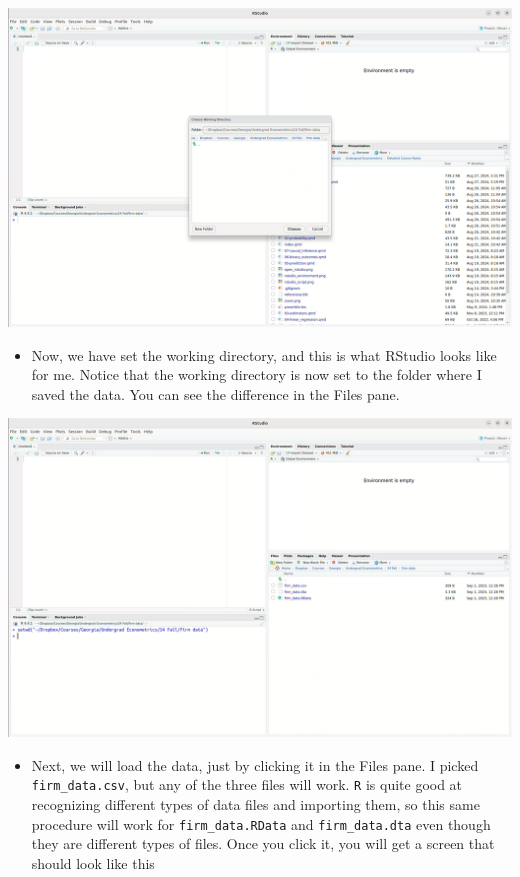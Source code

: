 \documentclass[
  letterpaper,
  DIV=11,
  numbers=noendperiod]{scrreprt}
\providecommand{\tightlist}{%
  \setlength{\itemsep}{0pt}\setlength{\parskip}{0pt}}\usepackage{longtable,booktabs,array}
\begin{document}
\includegraphics{set_wd2.png}

\begin{itemize}
\tightlist
\item
  Now, we have set the working directory, and this is what RStudio looks
  like for me. Notice that the working directory is now set to the
  folder where I saved the data. You can see the difference in the Files
  pane.
\end{itemize}

\includegraphics{set_wd3.png}

\begin{itemize}
\tightlist
\item
  Next, we will load the data, just by clicking it in the Files pane. I
  picked \texttt{firm\_data.csv}, but any of the three files will work.
  \texttt{R} is quite good at recognizing different types of data files
  and importing them, so this same procedure will work for
  \texttt{firm\_data.RData} and \texttt{firm\_data.dta} even though they
  are different types of files. Once you click it, you will get a screen
  that should look like this
\end{itemize}
\end{document}
